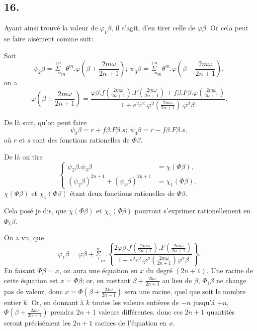 \documentclass{article}
\begin{document}
\subsection*{16.}

Ayant ainsi trouvé la valeur de $\varphi_{1}\beta$, il s'agit, d'en tirer celle de $\varphi\beta$. Or cela peut se faire aisément comme suit:

Soit
\[ \psi_{2}\beta=\overset{+n}{\underset{-n}{\Sigma}}_{m}\theta^{m}.\varphi\left(\beta+\frac{2m\omega}{2n+1}\right);\ \psi_{3}\beta=\overset{+n}{\underset{-n}{\Sigma}}_{m}\theta^{m}.\varphi\left(\beta-\frac{2m\omega}{2n+1}\right), \tag{78.} \]
on a
\[ \varphi\left(\beta\pm\frac{2m\omega}{2n+1}\right)=\frac{\varphi\beta.f\left(\frac{2m\omega}{2n+1}\right).F\left(\frac{2m\omega}{2n+1}\right)\pm f\beta.F\beta.\varphi\left(\frac{2m\omega}{2n+1}\right)}{1+e^{2}c^{2}.\varphi^{2}\left(\frac{2m\omega}{2n+1}\right).\varphi^{2}\beta}. \]

De là suit, qu'on peut faire
\[ \psi_{2}\beta=r+f\beta.F\beta.s;\ \psi_{3}\beta=r-f\beta.F\beta.s, \]
où $r$ et $s$ sont des fonctions rationelles de $\Phi\beta$.

De là on tire
\[ \left\{\begin{aligned}
\psi_{2}\beta.\psi_{3}\beta&=\chi(\Phi\beta),\\
(\psi_{2}\beta)^{2n+1}+(\psi_{3}\beta)^{2n+1}&=\chi_{1}(\Phi\beta),
\end{aligned}\right. \tag{79.} \]
$\chi(\Phi\beta)$ et $\chi_{1}(\Phi\beta)$ étant deux fonctions rationelles de $\Phi\beta$.

Cela posé je dis, que $\chi(\Phi\beta)$ et $\chi_{1}(\Phi\beta)$ pourront s'exprimer rationellement en $\Phi_{1}\beta$.

On a vu, que
\[ \varphi_{1}\beta=\varphi\beta+\overset{n}{\underset{1}{\Sigma}}_{m}.\left\{\frac{2\varphi\beta.f\left(\frac{2m\omega}{2n+1}\right).F\left(\frac{2m\omega}{2n+1}\right)}{1+e^{2}c^{2}.\varphi^{2}\left(\frac{2m\omega}{2n+1}\right)\varphi^{2}\beta}\right\}. \tag{80.} \]
En faisant $\Phi\beta=x$, on aura une équation en $x$ du degré $(2n+1)$. Une racine de cette équation est $x=\Phi\beta$; or, en mettant $\beta+\frac{2k\omega}{2n+1}$ au lieu de $\beta$, $\Phi_{1}\beta$ ne change pas de valeur, donc $x=\Phi\left(\beta+\frac{2k\omega}{2n+1}\right)$ sera une racine, quel que soit le nombre entier $k$. Or, en donnant à $k$ toutes les valeurs entières de $-n$ jusqu'á $+n$, $\Phi\left(\beta+\frac{2k\omega}{2n+1}\right)$ prendra $2n+1$ valeurs différentes, donc ces $2n+1$ quantités seront précisément les $2n+1$ racines de l'équation en $x$.
\end{document}
